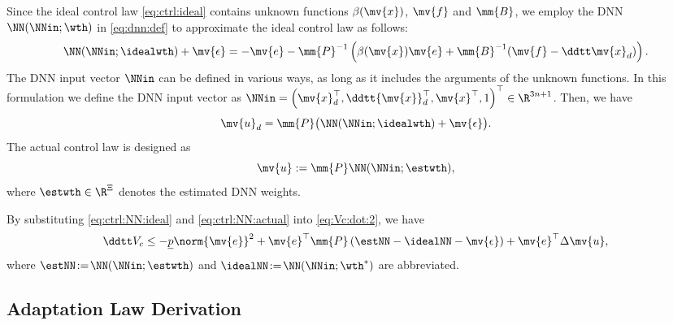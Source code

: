 \documentclass[letterpaper, journal]{IEEEtran}
\begin{document}
Since the ideal control law \eqref{eq:ctrl:ideal} contains unknown functions $\beta(\mv{x})$, $\mv{f}$ and $\mm{B}$, we employ the DNN $\NN(\NNin;\wth)$ in \eqref{eq:dnn:def} to approximate the ideal control law as follows:
\begin{equation*}
  \NN(\NNin;\idealwth)
  +
  \mv{\epsilon}
  =
  -\mv{e}
  -
  \mm{P}^{-1}
  \left(
  \beta(\mv{x})\mv{e}
  +
  \mm{B}^{-1}
  (
    \mv{f}
    -
    \ddtt \mv{x}_d
  )
  \right)
  .
\end{equation*}
The DNN input vector $\NNin$ can be defined in various ways, as long as it includes the arguments of the unknown functions.
In this formulation we define the DNN input vector as
$
  \NNin 
  = 
  \left(
    \mv{x}_d^\top, 
    \ddtt{\mv{x}}_d^\top, 
    \mv{x}^\top, 
    1 
  \right)^\top
  \in\R^{3n+1}
$.
Then, we have 
\begin{equation} \label{eq:ctrl:NN:ideal}
  \mv{u}_d
  =
  \mm{P}
  \big(
    \NN(\NNin;\idealwth)
    +
    \mv{\epsilon}
  \big)
  .
\end{equation}
The actual control law is designed as 
\begin{equation} \label{eq:ctrl:NN:actual}
  \mv{u}
  :=
  \mm{P}
  \NN(\NNin;\estwth)
  ,
\end{equation}
where $\estwth\in\R^{\Xi}$ denotes the estimated DNN weights.

By substituting \eqref{eq:ctrl:NN:ideal} and \eqref{eq:ctrl:NN:actual} into \eqref{eq:Vc:dot:2}, we have
\begin{equation} \label{eq:Vc:dot:3}
  \ddtt V_c
  \le
  - \underline{p}
  \norm{\mv{e}}^2
  +
  \mv{e}^\top\mm{P}
  \left(
    \estNN - \idealNN
    - \mv{\epsilon}
  \right)
  +
  \mv{e}^\top
  \Delta\mv{u}
  ,
\end{equation}
where $\estNN\!:=\!\NN(\NNin;\estwth)$ and $\idealNN\!:=\!\NN(\NNin;\wth^*)$ are abbreviated.

\subsection{Adaptation Law Derivation} \label{sec:main:result:sub:adap:laws}
\end{document}

